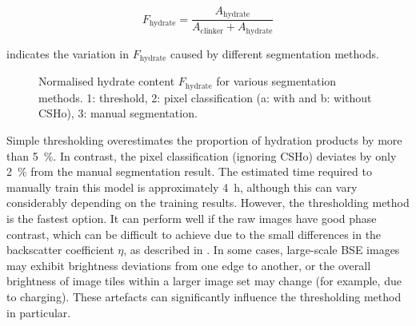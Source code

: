 \begin{equation}
	F_\text{hydrate} = \frac{A_{\text{hydrate}}}{A_{\text{clinker}} + A_{\text{hydrate}}}
\end{equation}

 indicates the variation in $F_\text{hydrate}$ caused by different segmentation methods.

\begin{figure}[htbp]
	\centering
	\caption{
		Normalised hydrate content $F_\text{hydrate}$ for various segmentation methods.
		1: threshold, 2: pixel classification (a: with and b: without \ac{CSHo}), 3: manual segmentation.
	}
	\label{fig:segmentation_hydrate_clinker_ratio}
\end{figure}

Simple thresholding overestimates the proportion of hydration products by more than \qty{5}{\percent}.
In contrast, the pixel classification (ignoring \ac{CSHo}) deviates by only \qty{2}{\percent} from the manual segmentation result.
The estimated time required to manually train this model is approximately \qty{4}{\hour}, although this can vary considerably depending on the training results.
However, the thresholding method is the fastest option.
It can perform well if the raw images have good phase contrast, which can be difficult to achieve due to the small differences in the backscatter coefficient $\eta$, as described in .
In some cases, large-scale \ac{BSE} images may exhibit brightness deviations from one edge to another, or the overall brightness of image tiles within a larger image set may change (for example, due to charging).
These artefacts can significantly influence the thresholding method in particular.

